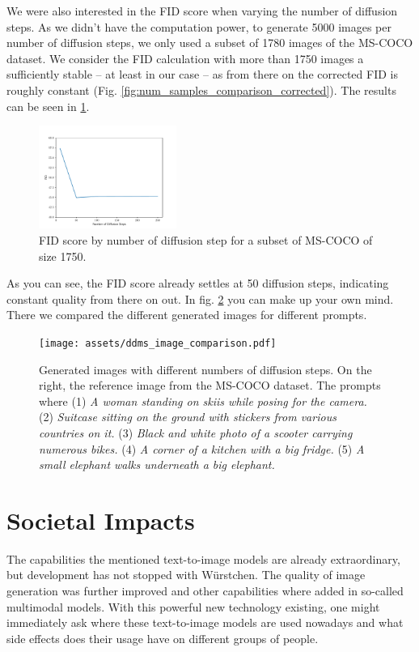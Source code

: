 \documentclass[11pt]{article}
\begin{document}
We were also interested in the FID score when varying the number of diffusion steps. As we didn't have the computation power, to generate 5000 images per number of diffusion steps, we only used a subset of 1780 images of the MS-COCO dataset. We consider the FID calculation with more than 1750 images a sufficiently stable – at least in our case – as from there on the corrected FID is roughly constant (Fig. \ref{fig:num_samples_comparison_corrected}). The results can be seen in \ref{fig:ddms_comparison}.
\begin{figure}[h]
    \centering
    \includegraphics[width=0.4\textwidth]{assets/ddms_comparison.pdf}
    \caption{FID score by number of diffusion step for a subset of MS-COCO of size 1750.}
    \label{fig:ddms_comparison}
\end{figure}

As you can see, the FID score already settles at 50 diffusion steps, indicating constant quality from there on out. In fig. \ref{fig:ddms_image_comparison} you can make up your own mind. There we compared the different generated images for different prompts.

\begin{figure}[h!]
    \centering
    \texttt{[image: assets/ddms\_image\_comparison.pdf]}
    \caption{Generated images with different numbers of diffusion steps. On the right, the reference image from the MS-COCO dataset. The prompts where (1) \textit{A woman standing on skiis while posing for the camera.} (2) \textit{Suitcase sitting on the ground with stickers from various countries on it.} (3) \textit{Black and white photo of a scooter carrying numerous bikes.} (4) \textit{A corner of a kitchen with a big fridge.} (5) \textit{A small elephant walks underneath a big elephant.}}
    \label{fig:ddms_image_comparison}
\end{figure}




\newpage

\section{Societal Impacts}
The capabilities the mentioned text-to-image models are already extraordinary, but development has not stopped with Würstchen. The quality of image generation was further improved\cite{lin2023designbenchexploringbenchmarkingdalle} and other capabilities where added in so-called multimodal models\cite{yasunaga2022retrievalaugmentedmultimodellanguagemodeling}. With this powerful new technology existing, one might immediately ask where these text-to-image models are used nowadays and what side effects does their usage have on different groups of people.
\end{document}
